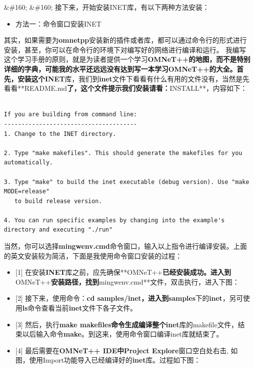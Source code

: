 \&\#160; \&\#160; 接下来，开始安装INET库，有以下两种方法安装：

\begin{itemize}
\item 方法一：命令窗口安装INET

\end{itemize}

其实，如果需要为\textbf{omnetpp}安装新的插件或者库，都可以通过命令行的形式进行安装，甚至，你可以在命令行的环境下对编写好的网络进行编译和运行。
我编写这个学习手册的原则，就是为读者提供一个学习\textbf{OMNeT++\textbf{的地图，而不是特别详细的字典，可能我的水平还远远没有达到写一本学习}OMNeT++\textbf{的大全。首先，安装这个}INET}库，我们到\textbf{inet}文件下看看有什么有用的文件没有，当然是先看看**README.md\textbf{了，这个文件提示我们安装请看：}INSTALL**，内容如下：

\begin{verbatim}

If you are building from command line:
--------------------------------------
1. Change to the INET directory.

2. Type "make makefiles". This should generate the makefiles for you automatically.

3. Type "make" to build the inet executable (debug version). Use "make MODE=release"
   to build release version.

4. You can run specific examples by changing into the example's directory and executing "./run"

\end{verbatim}

当然，你可以选择\textbf{mingwenv.cmd}命令窗口，输入以上指令进行编译安装。上面的英文安装较为简洁，下面是我使用命令窗口安装的过程：

\begin{itemize}
\item {[1]} 在安装\textbf{INET}库之前，应先确保**OMNeT++\textbf{已经安装成功。进入到}OMNeT++\textbf{安装路径，找到}mingwenv.cmd**文件，双击执行，进入下图：

\end{itemize}

\begin{itemize}
\item {[2]} 接下来，使用命令：\textbf{cd samples\slash inet\textbf{，进入到}samples}下的\textbf{inet}，另可使用\textbf{ls}命令查看当前\textbf{inet}文件下各子文件。

\item {[3]} 然后，执行\textbf{make makefiles\textbf{命令生成编译整个}inet}库的makefile文件，结束以后输入命令\textbf{make}。到这来，使用命令窗口编译inet库就结束了。

\item {[4]} 最后需要在\textbf{OMNeT++ IDE\textbf{中}Project Explore}窗口空白处右击, 如图，使用Import功能导入已经编译好的\textbf{inet}库。过程如下图：

\end{itemize}



